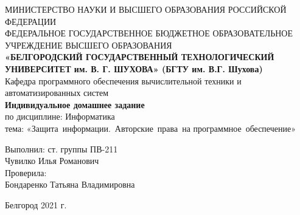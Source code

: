 \documentclass[12pt, oneside, a4paper]{article}
\begin{document}
\thispagestyle{empty}
\begin{center}
\large{\textsc{МИНИСТЕРСТВО НАУКИ И ВЫСШЕГО ОБРАЗОВАНИЯ РОССИЙСКОЙ ФЕДЕРАЦИИ\\
ФЕДЕРАЛЬНОЕ ГОСУДАРСТВЕННОЕ БЮДЖЕТНОЕ ОБРАЗОВАТЕЛЬНОЕ УЧРЕЖДЕНИЕ ВЫСШЕГО
ОБРАЗОВАНИЯ \\}}
\textbf{«БЕЛГОРОДСКИЙ ГОСУДАРСТВЕННЫЙ
ТЕХНОЛОГИЧЕСКИЙ УНИВЕРСИТЕТ им. В. Г. ШУХОВА»
(БГТУ им. В.Г. Шухова)}\\[1mm]
Кафедра программного обеспечения вычислительной техники и автоматизированных
систем\\[4.5cm]
\textbf{\huge Индивидуальное домашнее задание} \\
\large по дисциплине: Информатика\\
\large тема: «Защита~информации.~Авторские~права~на
программное~обеспечение»\\[3.5cm]
\end{center}
\begin{flushright}
\begin{minipage}{.45\textwidth}
Выполнил: ст. группы ПВ-211\\
Чувилко Илья Романович\\[3mm]
Проверила:\\
Бондаренко Татьяна Владимировна
\end{minipage}
\end{flushright}
\vfill
\begin{center}
\large Белгород 2021 г.
\end{center}
\thispagestyle{empty}
\newpage
\tableofcontents
\end{document}
